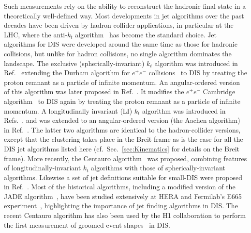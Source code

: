 Such measurements rely on the ability to reconstruct the
hadronic final state in a theoretically well-defined way.
Most developments in jet algorithms over the past decades have been
driven by hadron collider applications, in particular at the LHC,
where the anti-$k_t$ algorithm~\cite{Cacciari:2008gp} has become
the standard choice. Jet algorithms for DIS were developed around the
same time as those for hadronic collisions, but unlike for hadron
collisions, no single algorithm dominates the landscape.
%
The exclusive (spherically-invariant) $k_t$ algorithm was introduced
in Ref.~\cite{Catani:1992zp} extending the Durham algorithm for
$e^+e^-$ collisions~\cite{Catani:1991hj,Brown:1991hx} to DIS by
treating the proton remnant as a particle of infinite momentum. An
angular-ordered version of this algorithm was later proposed in
Ref.~\cite{Wobisch:1998wt}. It modifies the $e^+e^-$ Cambridge
algorithm~\cite{Dokshitzer:1997in} to DIS again by treating the proton
remnant as a particle of infinite momentum. A longitudinally invariant
(LI) $k_t$ algorithm was introduced in
Refs.~\cite{Ellis:1993tq,Catani:1993hr}, and was extended to an
angular-ordered version (the Aachen algorithm) in
Ref.~\cite{Wobisch:1998wt}. The latter two algorithms are identical to
the hadron-collider versions, except that the clustering takes place
in the Breit frame as is the case for all the DIS jet algorithms
listed here (cf.\ Sec.~\ref{sec:Kinematics} for details on the Breit
frame). More recently, the Centauro algorithm~\cite{Arratia:2020ssx}
was proposed, combining features of longitudinally-invariant $k_t$
algorithms with those of spherically-invariant algorithms. Likewise a
set of jet definitions suitable for small-\xB DIS were proposed in
Ref.~\cite{Caucal:2024vbv}. 
%
Most of the historical algorithms, including a modified version of the
JADE algorithm~\cite{JADE:1986kta,JADE:1988xlj}, have been studied
extensively at HERA and Fermilab's E665
experiment~\cite{E665:1992xqj,E665:1993vlk,H1:1994lps,ZEUS:1994jfw,ZEUS:1995tgg,H1:1995tux,H1:1998bvm,H1:1998rpm,H1:1998cuj,H1:2000bqr,H1:2002qhb,ZEUS:2002nms,ZEUS:2005iex,ZEUS:2006xvn,H1:2007xjj,H1:2009pqp,H1:2010mgp,H1:2014cbm},
highlighting the importance of jet finding algorithms in DIS. The
recent Centauro algorithm has also been used by the H1
collaboration to perform the first measurement of groomed event
shapes~\cite{H1:2024pvu} in DIS.

